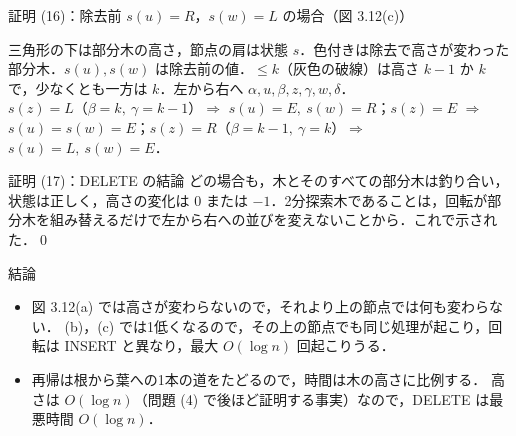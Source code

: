 \documentclass[aspectratio=169,11pt]{beamer}
\begin{document}
\begin{frame}{証明 (16)：除去前 $s(u)=R$，$s(w)=L$ の場合（図 3.12(c)）}
\begin{center}
\begin{tikzpicture}[avl,y=0.4cm]
  \end{tikzpicture}
  \end{center}
  \vspace{-6pt}\scriptsize 三角形の下は部分木の高さ，節点の肩は状態 $s$．色付きは除去で高さが変わった部分木．$s(u),s(w)$ は除去前の値．$\le k$（灰色の破線）は高さ $k-1$ か $k$ で，少なくとも一方は $k$．左から右へ $\alpha,u,\beta,z,\gamma,w,\delta$．\\
  $s(z)=L$（$\beta=k,\ \gamma=k-1$）$\Rightarrow$ $s(u)=E,\ s(w)=R$；$s(z)=E$ $\Rightarrow$ $s(u)=s(w)=E$；$s(z)=R$（$\beta=k-1,\ \gamma=k$）$\Rightarrow$ $s(u)=L,\ s(w)=E$．
\end{frame}

\begin{frame}{証明 (17)：DELETE の結論}
  \small
  どの場合も，木とそのすべての部分木は釣り合い，状態は正しく，高さの変化は 0 または $-1$．2分探索木であることは，回転が部分木を組み替えるだけで左から右への並びを変えないことから．これで示された．\qed
  \begin{alertblock}{結論}
    \begin{itemize}
      \item 図 3.12(a) では高さが変わらないので，それより上の節点では何も変わらない．
        (b)，(c) では1低くなるので，その上の節点でも同じ処理が起こり，回転は INSERT と異なり，最大 $O(\log n)$ 回起こりうる．
      \item 再帰は根から葉への1本の道をたどるので，時間は木の高さに比例する．
        高さは $O(\log n)$（問題 (4) で後ほど証明する事実）なので，DELETE は最悪時間 $O(\log n)$．
    \end{itemize}
  \end{alertblock}
\end{frame}
\end{document}
